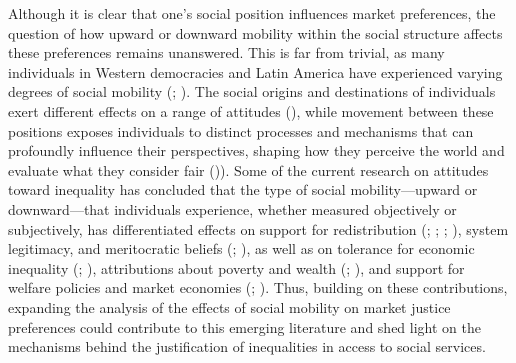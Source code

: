 \documentclass[
  12pt,
]{article}
\begin{document}
Although it is clear that one's social position influences market
preferences, the question of how upward or downward mobility within the
social structure affects these preferences remains unanswered. This is
far from trivial, as many individuals in Western democracies and Latin
America have experienced varying degrees of social mobility
(;
). The social origins and destinations of individuals exert
different effects on a range of attitudes
(), while
movement between these positions exposes individuals to distinct
processes and mechanisms that can profoundly influence their
perspectives, shaping how they perceive the world and evaluate what they
consider fair ()). Some of the current research on attitudes toward inequality has
concluded that the type of social mobility---upward or downward---that
individuals experience, whether measured objectively or subjectively,
has differentiated effects on support for redistribution
(;
;
; ), system legitimacy, and meritocratic beliefs
(;
), as well as on
tolerance for economic inequality
(;
), attributions
about poverty and wealth (;
),
and support for welfare policies and market economies
(;
). Thus, building on
these contributions, expanding the analysis of the effects of social
mobility on market justice preferences could contribute to this emerging
literature and shed light on the mechanisms behind the justification of
inequalities in access to social services.
\end{document}
